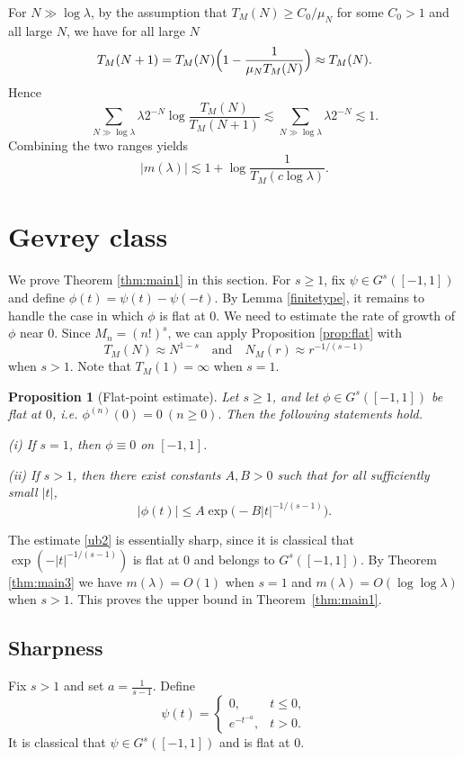 \documentclass[11pt]{amsart}
\newtheorem{proposition}[theorem]{Proposition}
\newcommand{\la}{\lambda}
\newcommand{\ls}{\lesssim}
\newcommand{\1}{{\rm 1\hspace*{-0.4ex}%
			\rule{0.1ex}{1.52ex}\hspace*{0.2ex}}}
\numberwithin{equation}{section}
\begin{document}
For $N\gg \log\la$, 
by the assumption that $T_M(N)\ge C_0/\mu_N$ for some $C_0>1$ and all large $N$, we have for all large $N$
\[
T_M(N+1)=T_M(N)\Bigl(1-\frac1{\mu_NT_M(N)}\Bigr)\approx T_M(N).
\]
Hence
\[
\sum_{N\gg \log\la}\lambda 2^{-N}\log\frac{T_M(N)}{T_M(N+1)}
\lesssim \sum_{N\gg \log\la}\lambda2^{-N}
\lesssim 1.
\]
Combining the two ranges yields
\[
|m(\lambda)|\ls 1+\log\frac1{T_M(c\log\lambda)}.
\]


\section{Gevrey class}\label{sec5}

We prove Theorem \ref{thm:main1} in this section. For $s\ge1$, fix $\psi\in G^s([-1,1])$ and define $\phi(t)=\psi(t)-\psi(-t)$. By Lemma \ref{finitetype}, it remains to handle the case in which $\phi$ is flat at $0$.
We need to estimate the rate of growth of $\phi$ near $0$. Since $M_n=(n!)^s$, we can apply Proposition \ref{prop:flat} with 
$$T_M(N)\approx N^{1-s}\quad \text{and}\quad N_M(r)\approx r^{-1/(s-1)}$$ 
when $s>1$. Note that $T_M(1)=\infty$ when $s=1$.


\begin{proposition}[Flat-point estimate]\label{prop2}
	Let $s\ge1$, and let $\phi\in G^s([-1,1])$ be flat at $0$, i.e. $\phi^{(n)}(0)=0\ (n\ge 0).$
Then the following statements hold.

\smallskip
\noindent
\textup{(i)} If $s=1$, then $\phi\equiv 0$ on $[-1,1]$.

\smallskip
\noindent
\textup{(ii)} If $s>1$, then there exist constants $A,B>0$ such that for all sufficiently small $|t|$,
\begin{equation}\label{ub2}
	|\phi(t)|\le A\exp\bigl(-B |t|^{-1/(s-1)}\bigr).
\end{equation}
\end{proposition}
The estimate \eqref{ub2} is essentially sharp, since it is classical that $\exp(-|t|^{-1/(s-1)})$ is flat at $0$ and belongs to $G^s([-1,1])$. By Theorem \ref{thm:main3} we have $m(\la)=O(1)$ when $s=1$ and $m(\la)=O(\log\log\la)$ when $s>1$.
This proves the upper bound in Theorem~\ref{thm:main1}.

\subsection{ Sharpness}

Fix $s>1$ and set $a=\frac{1}{s-1}$.
Define
\[
\psi(t)=
\begin{cases}
	0,& t\le 0,\\[2pt]
	e^{-t^{-a}},& t>0.
\end{cases}
\]
It is classical that $\psi\in G^s([-1,1])$ and is flat at $0$.
\end{document}
